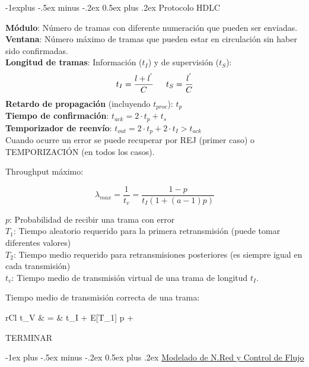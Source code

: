 \documentclass[10pt,landscape]{article}
\makeatletter
\renewcommand{\section}{\@startsection{section}{1}{0mm}%
                                {-1ex plus -.5ex minus -.2ex}%
                                {0.5ex plus .2ex}%
                                {\normalfont\large\bfseries}}
\renewcommand{\subsection}{\@startsection{subsection}{2}{0mm}%
                                {-1explus -.5ex minus -.2ex}%
                                {0.5ex plus .2ex}%
                                {\normalfont\normalsize\bfseries}}
\makeatother
\begin{document}
\begin{multicols}{3}
\subsection{Protocolo HDLC}

\textbf{Módulo}: Número de tramas con diferente numeración que pueden ser enviadas.\\
\textbf{Ventana}: Número máximo de tramas que pueden estar en circulación sin haber sido confirmadas.\\
\textbf{Longitud de tramas}: Información ($t_{I}$) y de supervisión ($t_{S}$):
	\begin{equation*}
		t_{I} = \frac{l + l^{'}}{C} \hspace{15 pt} t_{S} = \frac{l^{'}}{C}
	\end{equation*}
\textbf{Retardo de propagación} (incluyendo $t_{proc}$): $t_{p}$\\
\textbf{Tiempo de confirmación}: $t_{ack} = 2 \cdot t_{p} + t_{s}$\\
\textbf{Temporizador de reenvío}: $t_{out} = 2 \cdot t_{p} + 2 \cdot t_{I} > t_{ack}$\\
	
Cuando ocurre un error se puede recuperar por REJ (primer caso) o TEMPORIZACIÓN (en todos los casos).
	
Throughput máximo:

	\begin{equation*}
	\lambda_{max} = \frac{1}{t_{v}} = \frac{1 - p}{t_{I} (1 + (a - 1)p)}
	\end{equation*}

$p$: Probabilidad de recibir una trama con error\\
$T_{1}$: Tiempo aleatorio requerido para la primera retransmisión (puede tomar diferentes valores)\\
$T_{2}$: Tiempo medio requerido para retransmisiones posteriores (es siempre igual en cada transmisión)\\
$t_{v}$: Tiempo medio de transmisión virtual de una trama de longitud $t_{I}$.


Tiempo medio de transmisión correcta de una trama:

	\begin{IEEEeqnarray*}{rCl}
		t_{V} & = & t_{I} + E[T_{1}] p + 
	\end{IEEEeqnarray*}	


\Large{TERMINAR}


\section{\underline{Modelado de N.Red y Control de Flujo}}


\end{multicols}
\end{document}
